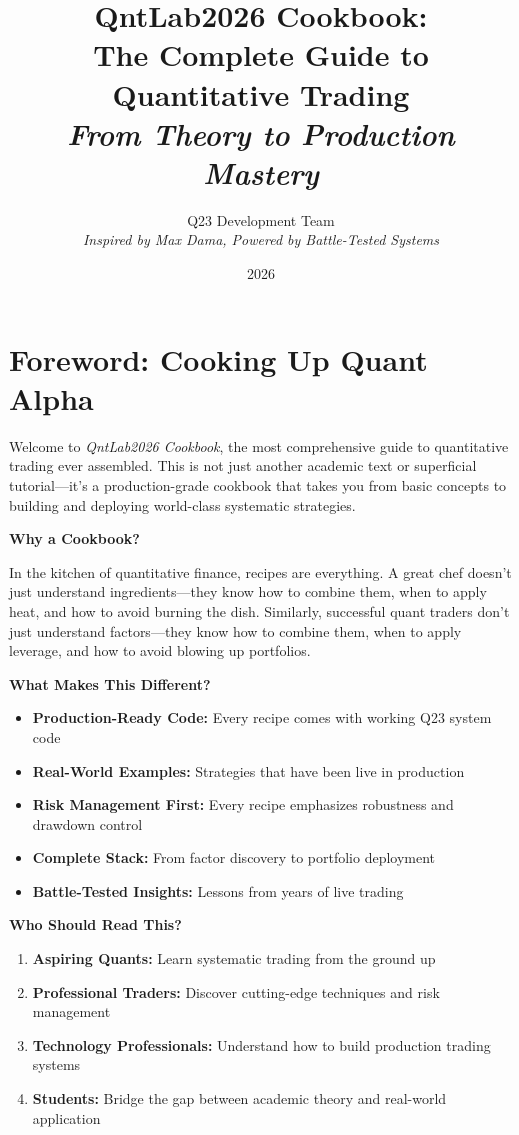 \documentclass[11pt,letterpaper,openany]{book}
\title{QntLab2026 Cookbook: \\
The Complete Guide to Quantitative Trading \\
\textit{From Theory to Production Mastery}}
\author{Q23 Development Team \\
\textit{Inspired by Max Dama, Powered by Battle-Tested Systems}}
\date{2026}
\begin{document}
\makeatletter
\@openrightfalse
\makeatother

\maketitle

\setcounter{tocdepth}{3}
\tableofcontents

\chapter*{Foreword: Cooking Up Quant Alpha}

Welcome to \textit{QntLab2026 Cookbook}, the most comprehensive guide to quantitative trading ever assembled. This is not just another academic text or superficial tutorial—it's a production-grade cookbook that takes you from basic concepts to building and deploying world-class systematic strategies.

\textbf{Why a Cookbook?}

In the kitchen of quantitative finance, recipes are everything. A great chef doesn't just understand ingredients—they know how to combine them, when to apply heat, and how to avoid burning the dish. Similarly, successful quant traders don't just understand factors—they know how to combine them, when to apply leverage, and how to avoid blowing up portfolios.

\textbf{What Makes This Different?}

\begin{itemize}
    \item \textbf{Production-Ready Code:} Every recipe comes with working Q23 system code
    \item \textbf{Real-World Examples:} Strategies that have been live in production
    \item \textbf{Risk Management First:} Every recipe emphasizes robustness and drawdown control
    \item \textbf{Complete Stack:} From factor discovery to portfolio deployment
    \item \textbf{Battle-Tested Insights:} Lessons from years of live trading
\end{itemize}

\textbf{Who Should Read This?}

\begin{enumerate}
    \item \textbf{Aspiring Quants:} Learn systematic trading from the ground up
    \item \textbf{Professional Traders:} Discover cutting-edge techniques and risk management
    \item \textbf{Technology Professionals:} Understand how to build production trading systems
    \item \textbf{Students:} Bridge the gap between academic theory and real-world application
\end{enumerate}
\end{document}

